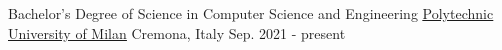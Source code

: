 

\begin{cventries}

  \cventry
    {Bachelor's Degree of Science in Computer Science and Engineering} %
    {\underline{\href{https://www.polimi.it/en/}{Polytechnic University of Milan}}} %
    {Cremona, Italy} %
    {Sep. 2021 - present} %
    {
    }

\end{cventries}
